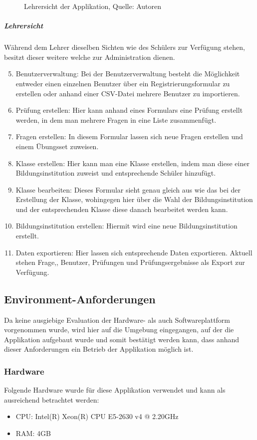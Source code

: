 \begin{figure}[H]
    \centering
    \caption[Lehrersicht der Applikation]{Lehrersicht der Applikation, Quelle: Autoren}
    \label{img: lehrersicht}
\end{figure}
\newpage
\subparagraph{Lehrersicht}
Während dem Lehrer dieselben Sichten wie des Schülers zur Verfügung stehen, besitzt dieser weitere welche zur Administration dienen.
\begin{enumerate}
    \setcounter{enumi}{4}
    \item Benutzerverwaltung: Bei der Benutzerverwaltung besteht die Möglichkeit entweder einen einzelnen Benutzer über ein Registrierungsformular zu erstellen oder anhand einer CSV-Datei mehrere Benutzer zu importieren.
    \item Prüfung erstellen: Hier kann anhand eines Formulars eine Prüfung erstellt werden, in dem man mehrere Fragen in eine Liste zusammenfügt.
    \item Fragen erstellen: In diesem Formular lassen sich neue Fragen erstellen und einem Übungsset zuweisen.
    \item Klasse erstellen: Hier kann man eine Klasse erstellen, indem man diese einer Bildungsinstitution zuweist und entsprechende Schüler hinzufügt.
    \item Klasse bearbeiten: Dieses Formular sieht genau gleich aus wie das bei der Erstellung der Klasse, wohingegen hier über die Wahl der Bildungsinstitution und der entsprechenden Klasse diese danach bearbeitet werden kann.
    \item Bildungsinstitution erstellen: Hiermit wird eine neue Bildungsinstitution erstellt.
    \item Daten exportieren: Hier lassen sich entsprechende Daten exportieren. Aktuell stehen Frage,, Benutzer, Prüfungen und Prüfungsergebnisse als Export zur Verfügung.
\end{enumerate}
\newpage
\subsection{Environment-Anforderungen}\label{environmentanforderungen}
Da keine ausgiebige Evaluation der Hardware- als auch Softwareplattform vorgenommen wurde, wird hier auf die Umgebung eingegangen, auf der die Applikation aufgebaut wurde und somit bestätigt werden kann, dass anhand dieser Anforderungen ein Betrieb der Applikation möglich ist.
\subsubsection{Hardware}
Folgende Hardware wurde für diese Applikation verwendet und kann als ausreichend betrachtet werden:
\begin{itemize}
    \item CPU: Intel(R) Xeon(R) CPU E5-2630 v4 @ 2.20GHz
    \item RAM: 4GB
\end{itemize}
